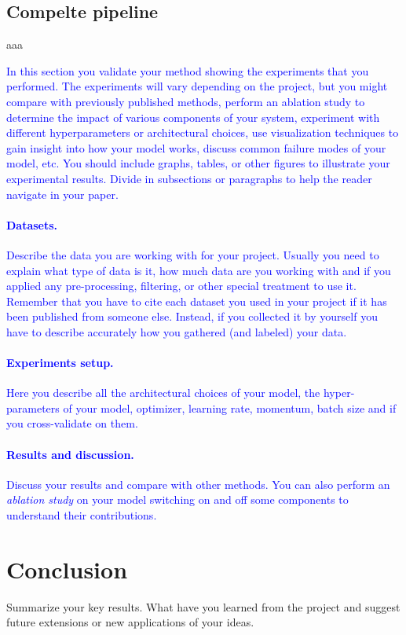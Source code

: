 \documentclass[10pt,twocolumn,letterpaper]{article}
\begin{document}
      
   \subsection{Compelte pipeline}
      aaa


\textcolor{blue}{
In this section you validate your method showing the experiments that you performed. The experiments will vary depending on the project, but you might compare with previously published methods, perform an ablation study to determine the impact of various components of your system, experiment with different hyperparameters or architectural choices, use visualization techniques to gain insight into how your model works, discuss common failure modes of your model, etc. You should include graphs, tables, or other figures to illustrate your experimental results. Divide in subsections or paragraphs to help the reader navigate in your paper.
\paragraph{Datasets.}
Describe the data you are working with for your project. Usually you need to explain what type of data is it, how much data are you working with and if you applied any pre-processing, filtering, or other special treatment to use it. Remember that you have to cite each dataset you used in your project if it has been published from someone else. Instead, if you collected it by yourself you have to describe accurately how you gathered (and labeled) your data. 
\paragraph{Experiments setup.}
Here you describe all the architectural choices of your model, the hyper-parameters of your model, \eg optimizer, learning rate, momentum, batch size and if you cross-validate on them. 
\paragraph{Results and discussion.}
Discuss your results and compare with other methods. You can also perform an \emph{ablation study} on your model switching on and off some components to understand their contributions.
}



\section{Conclusion} 
Summarize your key results. What have you learned from the project and suggest future extensions or new applications of your ideas.
\end{document}
